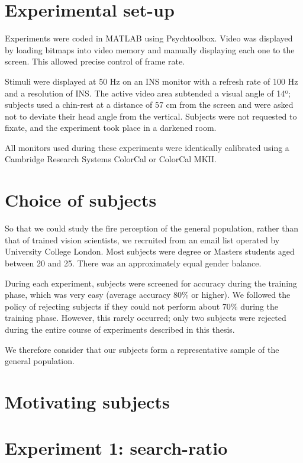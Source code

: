 \section{Experimental set-up}

Experiments were coded in MATLAB using Psychtoolbox. Video was displayed by loading bitmaps into video memory and manually displaying each one to the screen. This allowed precise control of frame rate.

Stimuli were displayed at 50 Hz on an INS monitor with a refresh rate of 100 Hz and a resolution of INS. The active video area subtended a visual angle of 14º; subjects used a chin-rest at a distance of 57 cm from the screen and were asked not to deviate their head angle from the vertical. Subjects were not requested to fixate, and the experiment took place in a darkened room.

All monitors used during these experiments were identically calibrated using a Cambridge Research Systems ColorCal or ColorCal MKII.


\section{Choice of subjects}

So that we could study the fire perception of the general population, rather than that of trained vision scientists, we recruited from an email list operated by University College London. Most subjects were degree or Masters students aged between 20 and 25. There was an approximately equal gender balance.

During each experiment, subjects were screened for accuracy during the training phase, which was very easy (average accuracy 80\% or higher). We followed the policy of rejecting subjects if they could not perform about 70\% during the training phase. However, this rarely occurred; only two subjects were rejected during the entire course of experiments described in this thesis.

We therefore consider that our subjects form a representative sample of the general population.

\section{Motivating subjects}




\section{Experiment 1: \textbf{search-ratio}}

